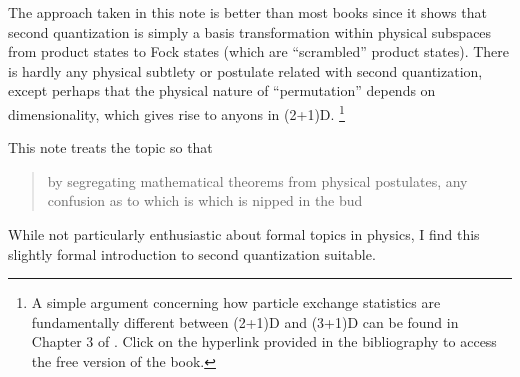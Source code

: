 \documentclass{article}
\theoremstyle{definition}
\theoremstyle{plain}
\numberwithin{equation}{section}
\begin{document}
The approach taken in this note is better than most books 
since it shows that second quantization is simply a basis 
transformation within physical subspaces from product states to 
Fock states (which are ``scrambled'' product states). 
There is hardly any physical subtlety or postulate 
related with second quantization, except perhaps 
that 
the physical nature of ``permutation'' depends on 
dimensionality, which gives rise to anyons in (2+1)D. 
\footnote{
    A simple argument concerning 
    how particle exchange statistics 
    are fundamentally different between 
    (2+1)D and (3+1)D can be found in 
    Chapter 3 of \cite{simon_topological_2023}.
    Click on the hyperlink provided 
    in the bibliography to access 
    the free version of the book.
}

This note treats 
the topic so that 
\blockcquote{shankar_principles_1994}{by segregating mathematical theorems from physical postulates, any confusion as to which is which is nipped in the bud}. 
While not particularly enthusiastic about formal topics in physics, 
I find this slightly formal introduction to second quantization suitable.


\printbibliography
\end{document}
